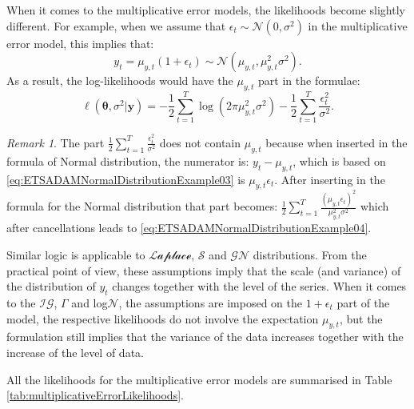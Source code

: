 \documentclass[]{book}
\theoremstyle{definition}
\theoremstyle{definition}
\theoremstyle{definition}
\theoremstyle{definition}
\theoremstyle{remark}
\newtheorem*{remark}{Remark}
\begin{document}
When it comes to the multiplicative error models, the likelihoods become slightly different. For example, when we assume that \(\epsilon_t \sim \mathcal{N}(0, \sigma^2)\) in the multiplicative error model, this implies that:
\begin{equation}
    y_t = \mu_{y,t}(1+\epsilon_t) \sim \mathcal{N}(\mu_{y,t}, \mu_{y,t}^2 \sigma^2) .
  \label{eq:ETSADAMNormalDistributionExample03}
\end{equation}
As a result, the log-likelihoods would have the \(\mu_{y,t}\) part in the formulae:
\begin{equation}
    \ell(\boldsymbol{\theta}, {\sigma}^2 | \mathbf{y}) = -\frac{1}{2} \sum_{t=1}^T \log(2 \pi \mu_{y,t}^2 \sigma^2) -\frac{1}{2} \sum_{t=1}^T \frac{\epsilon_t^2}{\sigma^2} .
  \label{eq:ETSADAMNormalDistributionExample04}
\end{equation}

\begin{remark}
The part \(\frac{1}{2} \sum_{t=1}^T \frac{\epsilon_t^2}{\sigma^2}\) does not contain \(\mu_{y,t}\) because when inserted in the formula of Normal distribution, the numerator is: \(y_t - \mu_{y,t}\), which is based on \eqref{eq:ETSADAMNormalDistributionExample03} is \(\mu_{y,t} \epsilon_t\). After inserting in the formula for the Normal distribution that part becomes: \(\frac{1}{2} \sum_{t=1}^T \frac{(\mu_{y,t} \epsilon_t)^2}{\mu_{y,t}^2\sigma^2}\) which after cancellations leads to \eqref{eq:ETSADAMNormalDistributionExample04}.
\end{remark}

Similar logic is applicable to \(\mathcal{Laplace}\), \(\mathcal{S}\) and \(\mathcal{GN}\) distributions. From the practical point of view, these assumptions imply that the scale (and variance) of the distribution of \(y_t\) changes together with the level of the series. When it comes to the \(\mathcal{IG}\), \(\Gamma\) and log\(\mathcal{N}\), the assumptions are imposed on the \(1+\epsilon_t\) part of the model, the respective likelihoods do not involve the expectation \(\mu_{y,t}\), but the formulation still implies that the variance of the data increases together with the increase of the level of data.

All the likelihoods for the multiplicative error models are summarised in Table \ref{tab:multiplicativeErrorLikelihoods}.
\end{document}
